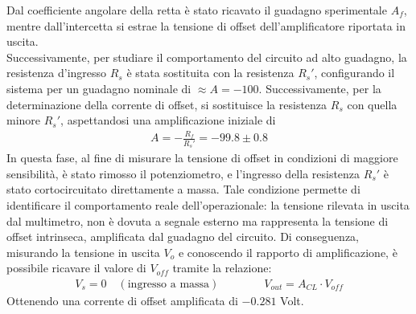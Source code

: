 \documentclass[a4paper, oneside]{article}
\begin{document}
Dal coefficiente angolare della retta è stato ricavato il guadagno sperimentale $A_f$,
mentre dall'intercetta si estrae la tensione di offset dell'amplificatore riportata in
uscita. \\ \noindent
Successivamente, per studiare il comportamento del circuito ad alto guadagno, la
resistenza d'ingresso $R_s$ è stata sostituita con la resistenza $R_s'$,
configurando il sistema per un guadagno nominale di $\approx A=-100$.
Successivamente, per la determinazione della corrente di offset,
si sostituisce la resistenza $R_s$ con quella minore
$R_s'$, aspettandosi una amplificazione iniziale di
\begin{align}
    A = - \frac{R_f}{R_s'} = -99.8 \pm 0.8
\end{align}
In questa fase, al fine di misurare la tensione di offset in condizioni di maggiore
sensibilità, è stato rimosso il potenziometro, e l'ingresso della resistenza $R_s'$
è stato cortocircuitato direttamente a massa.
Tale condizione permette di identificare il comportamento reale dell'operazionale: la tensione rilevata in uscita dal multimetro, non è dovuta a segnale esterno ma rappresenta la tensione di offset intrinseca, amplificata dal guadagno del circuito. Di conseguenza, misurando la tensione in uscita $V_o$ e conoscendo il rapporto di amplificazione, è possibile ricavare il valore di $V_{off}$ tramite la relazione:
\begin{align}
    V_s = 0 \quad (\text{ingresso a massa}) \qquad \qquad V_{out} = A_{CL} \cdot V_{off}
\end{align}
Ottenendo una corrente di offset amplificata di $-0.281$ Volt. 
\end{document}
